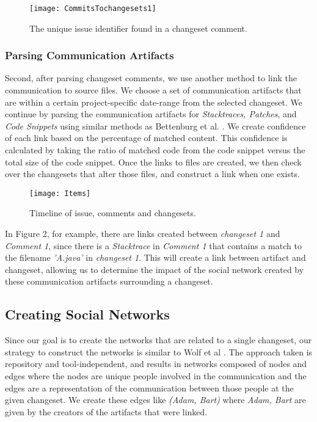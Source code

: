 \documentclass[conference]{IEEEtran}
\begin{document}
\begin{figure}[b!]
\centering
\texttt{[image: CommitsTochangesets1]}
\caption{The unique issue identifier found in a changeset comment.\label{fig:identifier}}
\end{figure}

\subsubsection{Parsing Communication Artifacts}
Second, after parsing changeset comments, we use another method to link the communication to source files.  We choose a set of communication artifacts that are within a certain project-specific date-range from the selected changeset.  We continue by parsing the communication artifacts for \textit{Stacktraces, Patches}, and \textit{Code Snippets} using similar methods as Bettenburg et al. \cite{Bettenburg:2008:ESI:1370750.1370757}.  We create confidence of each link based on the percentage of matched content.  This confidence is calculated by taking the ratio of matched code from the code snippet versus the total size of the code snippet. Once the links to files are created, we then check over the changesets that alter those files, and construct a link when one exists.  


\begin{figure}[t!]
\centering
\texttt{[image: Items]}
\caption{Timeline of issue, comments and changesets.\label{fig:items}}
\end{figure}

In Figure 2, for example, there are links created between \emph{changeset 1} and \emph{Comment 1}, since there is a \emph{Stacktrace} in \emph{Comment 1} that contains a match to the filename \emph{'A.java'} in \emph{changeset 1}.  This will create a link between artifact and changeset, allowing us to determine the impact of the social network created by these communication artifacts surrounding a changeset.

\subsection{Creating Social Networks} 
Since our goal is to create the networks that are related to a single changeset, our strategy to construct the networks is similar to Wolf et al \cite{4721184}.  The approach taken is repository and tool-independent, and results in networks composed of nodes and edges where the nodes are unique people involved in the communication and the edges are a representation of the communication between those people at the given changeset.  We create these edges like \emph{(Adam, Bart)} where \emph{Adam, Bart} are given by the creators of the artifacts that were linked.   
\end{document}
